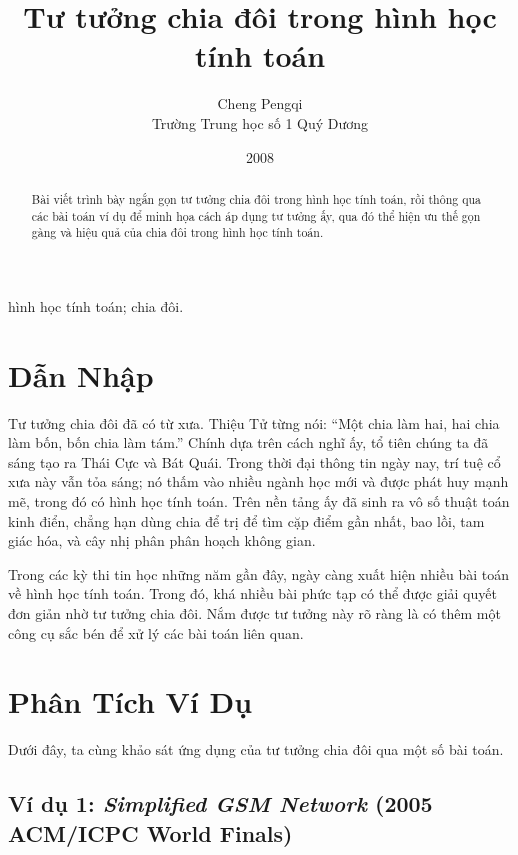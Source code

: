 \documentclass[11pt]{article}
\title{Tư tưởng chia đôi trong hình học tính toán}
\author{Cheng Pengqi\\
Trường Trung học số 1 Quý Dương}
\date{2008}
\begin{document}
\maketitle


\begin{abstract}
Bài viết trình bày ngắn gọn tư tưởng chia đôi trong hình học tính toán, rồi
thông qua các bài toán ví dụ để minh họa cách áp dụng tư tưởng ấy, qua đó thể
hiện ưu thế gọn gàng và hiệu quả của chia đôi trong hình học tính toán.
\end{abstract}

\noindent{} hình học tính toán; chia đôi.

\section{Dẫn Nhập}

Tư tưởng chia đôi đã có từ xưa. Thiệu Tử từng nói: ``Một chia làm hai, hai
chia làm bốn, bốn chia làm tám.'' Chính dựa trên cách nghĩ ấy, tổ tiên chúng
ta đã sáng tạo ra Thái Cực và Bát Quái. Trong thời đại thông tin ngày nay,
trí tuệ cổ xưa này vẫn tỏa sáng; nó thấm vào nhiều ngành học mới và được phát
huy mạnh mẽ, trong đó có hình học tính toán. Trên nền tảng ấy đã sinh ra vô
số thuật toán kinh điển, chẳng hạn dùng chia để trị để tìm cặp điểm gần nhất,
bao lồi, tam giác hóa, và cây nhị phân phân hoạch không gian.

Trong các kỳ thi tin học những năm gần đây, ngày càng xuất hiện nhiều bài toán
về hình học tính toán. Trong đó, khá nhiều bài phức tạp có thể được giải quyết
đơn giản nhờ tư tưởng chia đôi. Nắm được tư tưởng này rõ ràng là có thêm một
công cụ sắc bén để xử lý các bài toán liên quan.

\section{Phân Tích Ví Dụ}

Dưới đây, ta cùng khảo sát ứng dụng của tư tưởng chia đôi qua một số bài toán.

\subsection{Ví dụ 1: \textit{Simplified GSM Network} (2005 ACM/ICPC World Finals)}
\end{document}
